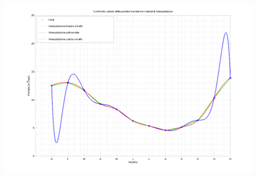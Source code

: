 \documentclass{article}
\begin{document}
\centerline{\includegraphics[scale=0.6]{ex61.png}}


\newpage
\end{document}
